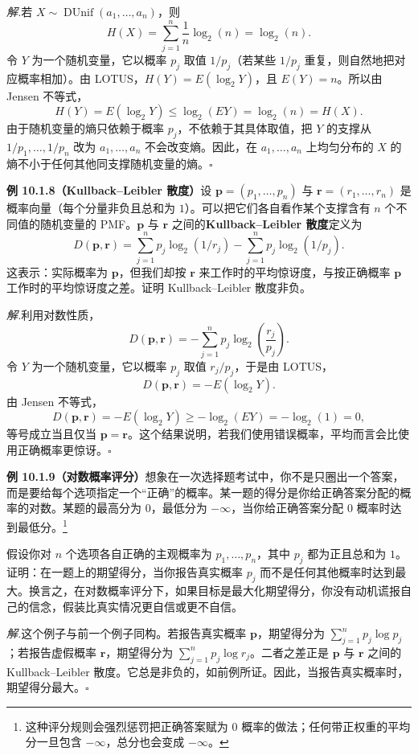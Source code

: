 \documentclass[UTF8,12pt,a4paper,fontset=fandol]{ctexart}
\begin{document}
\noindent\textit{解.}\quad 若 $X\sim\operatorname{DUnif}(a_1,\ldots,a_n)$，则
\[
  H(X)=\sum_{j=1}^n \frac1n\log_2(n)=\log_2(n).
\]
令 $Y$ 为一个随机变量，它以概率 $p_j$ 取值 $1/p_j$（若某些 $1/p_j$ 重复，则自然地把对应概率相加）。由 LOTUS，$H(Y)=E(\log_2 Y)$，且 $E(Y)=n$。所以由 Jensen 不等式，
\[
  H(Y)=E(\log_2 Y)\le \log_2(EY)=\log_2(n)=H(X).
\]
由于随机变量的熵只依赖于概率 $p_j$，不依赖于其具体取值，把 $Y$ 的支撑从 $1/p_1,\ldots,1/p_n$ 改为 $a_1,\ldots,a_n$ 不会改变熵。因此，在 $a_1,\ldots,a_n$ 上均匀分布的 $X$ 的熵不小于任何其他同支撑随机变量的熵。$\square$

\noindent\textbf{例 10.1.8（Kullback--Leibler 散度）}\quad 设 $\mathbf p=(p_1,\ldots,p_n)$ 与 $\mathbf r=(r_1,\ldots,r_n)$ 是概率向量（每个分量非负且总和为 $1$）。可以把它们各自看作某个支撑含有 $n$ 个不同值的随机变量的 PMF。$\mathbf p$ 与 $\mathbf r$ 之间的\textbf{Kullback--Leibler 散度}定义为
\[
  D(\mathbf p,\mathbf r)
  =\sum_{j=1}^n p_j\log_2(1/r_j)
  -\sum_{j=1}^n p_j\log_2(1/p_j).
\]
这表示：实际概率为 $\mathbf p$，但我们却按 $\mathbf r$ 来工作时的平均惊讶度，与按正确概率 $\mathbf p$ 工作时的平均惊讶度之差。证明 Kullback--Leibler 散度非负。

\noindent\textit{解.}\quad 利用对数性质，
\[
  D(\mathbf p,\mathbf r)
  =-\sum_{j=1}^n p_j\log_2\left(\frac{r_j}{p_j}\right).
\]
令 $Y$ 为一个随机变量，它以概率 $p_j$ 取值 $r_j/p_j$，于是由 LOTUS，
\[
  D(\mathbf p,\mathbf r)=-E(\log_2 Y).
\]
由 Jensen 不等式，
\[
  D(\mathbf p,\mathbf r)
  =-E(\log_2 Y)\ge -\log_2(EY)=-\log_2(1)=0,
\]
等号成立当且仅当 $\mathbf p=\mathbf r$。这个结果说明，若我们使用错误概率，平均而言会比使用正确概率更惊讶。$\square$

\noindent\textbf{例 10.1.9（对数概率评分）}\quad 想象在一次选择题考试中，你不是只圈出一个答案，而是要给每个选项指定一个“正确”的概率。某一题的得分是你给正确答案分配的概率的对数。某题的最高分为 $0$，最低分为 $-\infty$，当你给正确答案分配 $0$ 概率时达到最低分。\footnote{这种评分规则会强烈惩罚把正确答案赋为 $0$ 概率的做法；任何带正权重的平均分一旦包含 $-\infty$，总分也会变成 $-\infty$。}

假设你对 $n$ 个选项各自正确的主观概率为 $p_1,\ldots,p_n$，其中 $p_j$ 都为正且总和为 $1$。证明：在一题上的期望得分，当你报告真实概率 $p_j$ 而不是任何其他概率时达到最大。换言之，在对数概率评分下，如果目标是最大化期望得分，你没有动机谎报自己的信念，假装比真实情况更自信或更不自信。

\noindent\textit{解.}\quad 这个例子与前一个例子同构。若报告真实概率 $\mathbf p$，期望得分为 $\sum_{j=1}^n p_j\log p_j$；若报告虚假概率 $\mathbf r$，期望得分为 $\sum_{j=1}^n p_j\log r_j$。二者之差正是 $\mathbf p$ 与 $\mathbf r$ 之间的 Kullback--Leibler 散度。它总是非负的，如前例所证。因此，当报告真实概率时，期望得分最大。$\square$
\end{document}
